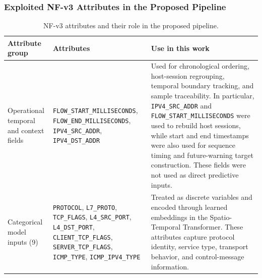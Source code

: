 \documentclass[12pt, a4paper]{report}
\begin{document}
\subsubsection{Exploited NF-v3 Attributes in the Proposed Pipeline}
\begin{table}[H]
\centering
\footnotesize
\caption{NF-v3 attributes and their role in the proposed pipeline.}
\label{tab:nfv3_attributes}
\begin{tabularx}{\linewidth}{|p{3.1cm}|p{7.4cm}|X|}
\hline
\textbf{Attribute group} & \textbf{Attributes} & \textbf{Use in this work} \\
\hline
Operational temporal and context fields
&
\texttt{FLOW\_START\_MILLISECONDS}, \texttt{FLOW\_END\_MILLISECONDS}, 
\texttt{IPV4\_SRC\_ADDR}, \texttt{IPV4\_DST\_ADDR}
&
Used for chronological ordering, host-session regrouping, temporal boundary tracking, and sample traceability. In particular, \texttt{IPV4\_SRC\_ADDR} and \texttt{FLOW\_START\_MILLISECONDS} were used to rebuild host sessions, while start and end timestamps were also used for sequence timing and future-warning target construction. These fields were not used as direct predictive inputs.
\\ \hline

Categorical model inputs (9)
&
\texttt{PROTOCOL}, \texttt{L7\_PROTO}, \texttt{TCP\_FLAGS}, \texttt{L4\_SRC\_PORT}, \texttt{L4\_DST\_PORT}, \texttt{CLIENT\_TCP\_FLAGS}, \texttt{SERVER\_TCP\_FLAGS}, \texttt{ICMP\_TYPE}, \texttt{ICMP\_IPV4\_TYPE}
&
Treated as discrete variables and encoded through learned embeddings in the Spatio-Temporal Transformer. These attributes capture protocol identity, service type, transport behavior, and control-message information.
\\ \hline


\end{tabularx}
\end{table}
\end{document}
